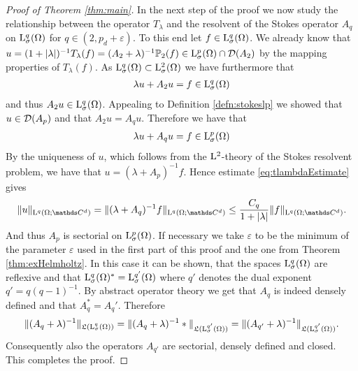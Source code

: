 \begin{proof}[Proof of Theorem \ref{thm:main}]
  In the next step of the proof we now study the relationship between the operator $T_\lambda$ and the resolvent of the Stokes operator $A_q$ on $\mathrm{L}^q_\sigma(\Omega)$ for $q \in (2, p_d + \varepsilon)$.
  To this end let $f \in \mathrm{L}^q_\sigma(\Omega)$.
  We already know that $u = (1 + |\lambda|)^{-1} T_\lambda(f) = (A_2 + \lambda)^{-1} \mathbb{P}_2(f) \in \mathrm{L}^p_\sigma(\Omega) \cap \mathcal{D}(A_2)$  by the mapping properties of $T_\lambda(f)$. As $\mathrm{L}^q_\sigma(\Omega) \subset \mathrm{L}^2_\sigma(\Omega)$ we have furthermore that
  \begin{align*}
    \lambda u + A_2 u = f \in \mathrm{L}^q_\sigma(\Omega)
  \end{align*}
  and thus $A_2 u \in \mathrm{L}^q_\sigma(\Omega)$.
  Appealing to Definition \ref{defn:stokeslp} we showed that $u \in \mathcal{D}(A_p)$ and that $A_2u = A_q u$. 
  Therefore we have that
  \begin{align*}
    \lambda u + A_q u = f \in \mathrm{L}^p_\sigma(\Omega)
  \end{align*}
  By the uniqueness of $u$, which follows from the $\mathrm{L}^2$-theory of the Stokes resolvent problem, we have that $u = (\lambda + A_p)^{-1} f$.
  Hence estimate \ref{eq:tlambdaEstimate} gives
  \begin{align*}
    \|u\|_{\Ell^q(\Omega; \C^d)} = \|(\lambda + A_q)^{-1}f \|_{\Ell^q(\Omega; \C^d)}
    \leq \frac{C_q}{ 1 + |\lambda|} \|f\|_{\Ell^q(\Omega; \C^d)}.
  \end{align*}
  And thus $A_p$ is sectorial on $\mathrm{L}^p_\sigma(\Omega)$.
  If necessary we take $\varepsilon$ to be the minimum of the parameter $\varepsilon$ used in the first part of this proof and the one from Theorem \ref{thm:exHelmholtz}.
  In this case it can be shown, that the spaces $\mathrm{L}^q_\sigma(\Omega)$ are reflexive and that $\mathrm{L}^q_\sigma(\Omega)^* = \mathrm{L}^{q'}_\sigma(\Omega)$ where $q'$ denotes the dual exponent $q' = q (q - 1)^{-1}$.
  By abstract operator theory \cite{haase} we get that $A_q$ is indeed densely defined and that $A_q^* =  A_q'$.
  Therefore
  \begin{align*}
    \| (A_q + \lambda)^{-1} \|_{\mathfrak{L}(\mathrm{L}^q_\sigma(\Omega))}
    = \| (A_q + \lambda)^{-1}* \|_{\mathfrak{L}(\mathrm{L}^{q'}_\sigma(\Omega))}
    = \| (A_{q'} + \lambda)^{-1} \|_{\mathfrak{L}(\mathrm{L}^{q'}_\sigma(\Omega))}.
  \end{align*}
  Consequently also the operators $A_{q'}$ are sectorial, densely defined and closed.
  This completes the proof.
\end{proof}
